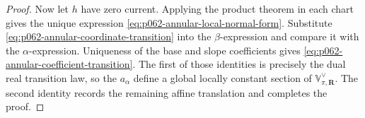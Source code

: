 \begin{proof}
Now let $h$ have zero current.  Applying the product theorem in each chart
gives the unique expression \eqref{eq:p062-annular-local-normal-form}.
Substitute \eqref{eq:p062-annular-coordinate-transition} into the
$\beta$-expression and compare it with the $\alpha$-expression.  Uniqueness
of the base and slope coefficients gives
\eqref{eq:p062-annular-coefficient-transition}.  The first of those
identities is precisely the dual real transition law, so the $a_\alpha$
define a global locally constant section of
$\mathbb{V}_{\pi,\mathbf R}^\vee$.  The second identity records the remaining
affine translation and completes the proof.
\end{proof}
